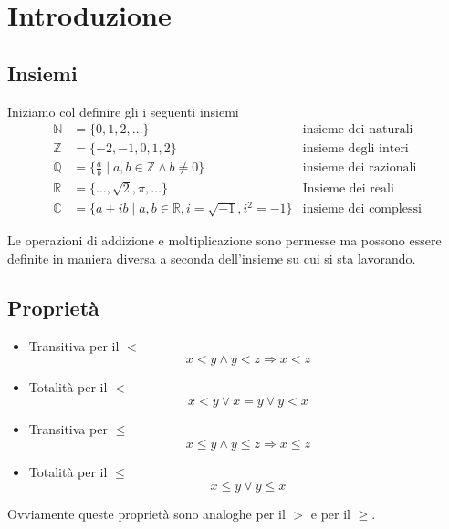 \chapter{Introduzione}
\section{Insiemi}
Iniziamo col definire gli i seguenti insiemi
\begin{equation*}
	\begin{array}{lll}
		\mathbb{N} & = \{ 0, 1, 2, \dots \}
		           & \text{insieme dei naturali}                                     \\
		\mathbb{Z} & = \{ -2, -1, 0, 1, 2 \}
		           & \text{insieme degli interi}                                     \\
		\mathbb{Q} & = \{ \frac{a}{b} \mid a, b \in \mathbb{Z} \wedge b \neq 0 \}
		           & \text{insieme dei razionali}                                    \\
		\mathbb{R} & = \{ \dots, \sqrt{2}, \pi, \dots \}
		           & \text{Insieme dei reali}                                        \\
		\mathbb{C} & = \{ a + ib \mid a, b \in \mathbb{R}, i = \sqrt{-1}, i^2 = -1\}
		           & \text{insieme dei complessi}
	\end{array}
\end{equation*}

Le operazioni di addizione e moltiplicazione sono permesse ma possono essere definite
in maniera diversa a seconda dell'insieme su cui si sta lavorando.

\section{Propriet\`a}
\begin{itemize}
	\item Transitiva per il $<$
	      \begin{equation*}
		      x < y \wedge y < z \Rightarrow x < z
	      \end{equation*}

	\item Totalit\`a per il $<$
	      \begin{equation*}
		      x < y \vee x = y \vee y < x
	      \end{equation*}

	\item Transitiva per $\leq$
	      \begin{equation*}
		      x \leq y \wedge y \leq z \Rightarrow x \leq z
	      \end{equation*}

	\item Totalit\`a per il $\leq$
	      \begin{equation*}
		      x \leq y \vee y \leq x
	      \end{equation*}
\end{itemize}
Ovviamente queste propriet\`a sono analoghe per il $>$ e per il $\geq$.

